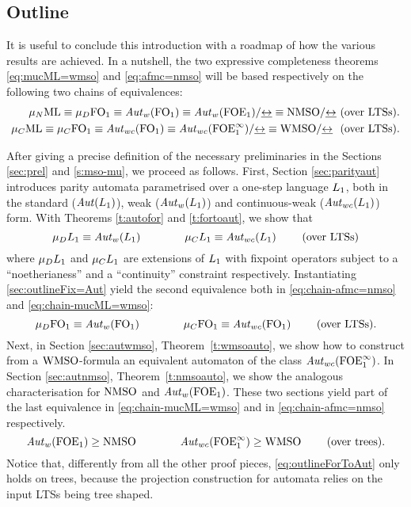 \subsection{Outline}

It is useful to conclude this introduction with a roadmap of how the various
results are achieved. 
In a nutshell, the two expressive completeness theorems \eqref{eq:mucML=wmso} 
and \eqref{eq:afmc=nmso} will be based respectively on the following two chains 
of equivalences:
\begin{eqnarray}
\AFMC \equiv \mu_{D}\ofo \equiv \AutW(\ofo) \equiv \AutW(\ofoe)/{\bis} \equiv \nmso/{\bis}  \ \text{(over  LTSs)}.\label{eq:chain-afmc=nmso}
\\
	\mucML \equiv \mu_{C}\ofo \equiv \AutWC(\ofo) \equiv \AutWC(\ofoei)/{\bis} \equiv \wmso/{\bis}  \ \text{  (over LTSs)}. \label{eq:chain-mucML=wmso}
\end{eqnarray}

After giving a precise definition of the necessary preliminaries in 
the Sections \ref{sec:prel} and \ref{s:mso-mu}, we proceed as follows. 
First, Section \ref{sec:parityaut} introduces parity automata parametrised over 
a one-step language $L_{1}$, both in the standard ($\mathit{Aut}(L_{1})$), weak 
($\mathit{Aut}_{w}(L_{1})$) and continuous-weak ($\mathit{Aut}_{wc}(L_{1})$) form. 
With Theorems \ref{t:autofor} and \ref{t:fortoaut}, we show that
\begin{equation}\label{sec:outlineFix=Aut}
\mu_{D}\oslang\equiv \AutW(\oslang)  \qquad \qquad \mu_{C}\oslang \equiv \AutWC(\oslang)    \qquad\text{ (over LTSs)}
\end{equation}
where $\mu_{D}L_{1}$ and $\mu_{C}L_{1}$ are extensions of $L_{1}$ with fixpoint operators subject to a ``noetherianess'' and a ``continuity'' constraint respectively. Instantiating \eqref{sec:outlineFix=Aut} yield the second equivalence both in \eqref{eq:chain-afmc=nmso} and \eqref{eq:chain-mucML=wmso}:
\begin{equation*}
	 \mu_{D}\ofo \equiv \AutW(\ofo) \qquad \qquad \mu_{C}\ofo \equiv \AutWC(\ofo)  \qquad \text{ (over LTSs)}.
\end{equation*}
Next, in Section \ref{sec:autwmso}, Theorem~\ref{t:wmsoauto}, we show how to construct from a $\mathrm{WMSO}$-formula an equivalent automaton of the class $\mathit{Aut}_{wc}(\mathrm{FOE}^{\infty}_1)$. In Section \ref{sec:autnmso}, Theorem~\ref{t:nmsoauto}, we show the analogous characterisation for $\mathrm{NMSO}$ and $\mathit{Aut}_{w}(\mathrm{FOE}_1)$. These two sections yield part of the last equivalence in \eqref{eq:chain-mucML=wmso} and in \eqref{eq:chain-afmc=nmso} respectively. 
\begin{equation} \label{eq:outlineForToAut}
 \AutW(\ofoe) \geq \nmso \qquad \qquad {\AutWC(\ofoei)} \geq \wmso \qquad \text{ (over trees)}.
 \end{equation}
Notice that, differently from all the other proof pieces, \eqref{eq:outlineForToAut} only holds on trees, because the projection construction for automata relies on the input LTSs being tree shaped. 

